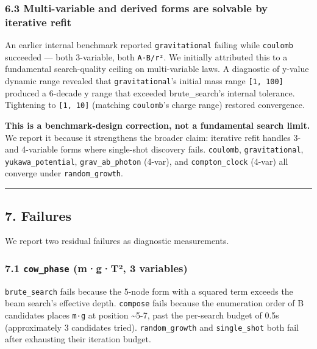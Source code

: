 \documentclass[
]{article}
\begin{document}
\subsubsection{6.3 Multi-variable and derived forms are solvable by
iterative
refit}\label{multi-variable-and-derived-forms-are-solvable-by-iterative-refit}

An earlier internal benchmark reported \texttt{gravitational} failing
while \texttt{coulomb} succeeded --- both 3-variable, both
\texttt{A·B/r²}. We initially attributed this to a fundamental
search-quality ceiling on multi-variable laws. A diagnostic of y-value
dynamic range revealed that \texttt{gravitational}'s initial mass range
\texttt{{[}1,\ 100{]}} produced a 6-decade y range that exceeded
brute\_search's internal tolerance. Tightening to \texttt{{[}1,\ 10{]}}
(matching \texttt{coulomb}'s charge range) restored convergence.

\textbf{This is a benchmark-design correction, not a fundamental search
limit.} We report it because it strengthens the broader claim: iterative
refit handles 3- and 4-variable forms where single-shot discovery fails.
\texttt{coulomb}, \texttt{gravitational}, \texttt{yukawa\_potential},
\texttt{grav\_ab\_photon} (4-var), and \texttt{compton\_clock} (4-var)
all converge under \texttt{random\_growth}.

\begin{center}\rule{0.5\linewidth}{0.5pt}\end{center}

\subsection{7. Failures}\label{failures}

We report two residual failures as diagnostic measurements.

\subsubsection{\texorpdfstring{7.1 \texttt{cow\_phase} (m·g·T², 3
variables)}{7.1 cow\_phase (m·g·T², 3 variables)}}\label{cow_phase-mgtuxb2-3-variables}

\texttt{brute\_search} fails because the 5-node form with a squared term
exceeds the beam search's effective depth. \texttt{compose} fails
because the enumeration order of B candidates places \texttt{m·g} at
position \textasciitilde5-7, past the per-search budget of 0.5s
(approximately 3 candidates tried). \texttt{random\_growth} and
\texttt{single\_shot} both fail after exhausting their iteration budget.
\end{document}

